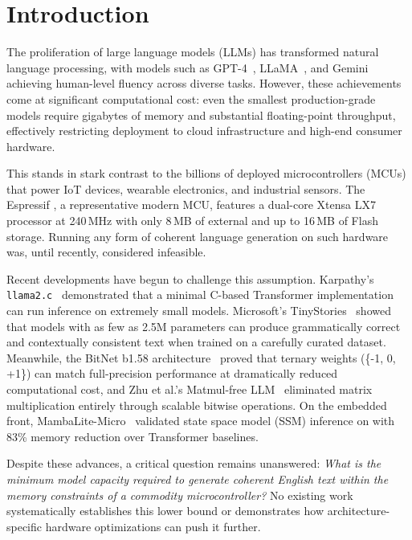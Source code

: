 \section{Introduction}
\label{sec:introduction}

The proliferation of large language models (LLMs) has transformed natural
language processing, with models such as GPT-4~\cite{openai2023gpt4},
LLaMA~\cite{touvron2023llama}, and Gemini~\cite{team2023gemini} achieving
human-level fluency across diverse tasks. However, these achievements come at
significant computational cost: even the smallest production-grade models
require gigabytes of memory and substantial floating-point throughput,
effectively restricting deployment to cloud infrastructure and high-end consumer
hardware.

This stands in stark contrast to the billions of deployed microcontrollers
(MCUs) that power IoT devices, wearable electronics, and industrial sensors.
The Espressif \espss{}, a representative modern MCU, features a dual-core
Xtensa LX7 processor at 240\,MHz with only 8\,MB of external \psram{} and up
to 16\,MB of Flash storage. Running any form of coherent language generation on
such hardware was, until recently, considered infeasible.

Recent developments have begun to challenge this assumption. Karpathy's
\texttt{llama2.c}~\cite{karpathy2023llama2c} demonstrated that a minimal
C-based Transformer implementation can run inference on extremely small models.
Microsoft's TinyStories~\cite{eldan2023tinystories} showed that models with as
few as 2.5M parameters can produce grammatically correct and contextually
consistent text when trained on a carefully curated dataset. Meanwhile,
the BitNet b1.58 architecture~\cite{ma2024bitnet} proved that ternary
weights (\{-1, 0, +1\}) can match full-precision performance at dramatically
reduced computational cost, and Zhu et al.'s Matmul-free
LLM~\cite{zhu2024matmulfree} eliminated matrix multiplication entirely
through scalable bitwise operations. On the embedded front,
MambaLite-Micro~\cite{mambalite2024} validated state space model (SSM)
inference on \espss{} with 83\% memory reduction over Transformer baselines.

Despite these advances, a critical question remains unanswered:
\emph{What is the minimum model capacity required to generate coherent
English text within the memory constraints of a commodity microcontroller?}
No existing work systematically establishes this lower bound or demonstrates
how architecture-specific hardware optimizations can push it further.

